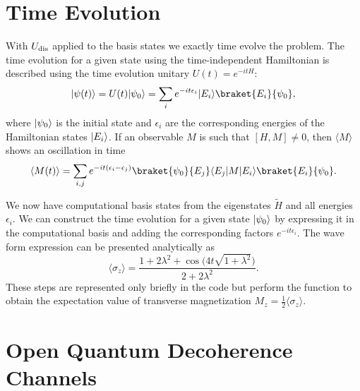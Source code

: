 \documentclass[12pt, twocolumn]{article}
\newcommand*{\eu}{e}
\newcommand*{\iu}{i}
\DeclarePairedDelimiter{\bra}{\langle}{\rvert}
\DeclarePairedDelimiter{\ket}{\lvert}{\rangle}
\begin{document}
  \section{Time Evolution}
  With \( U_{\textnormal{dis}} \) applied to the basis states we exactly time evolve the problem. The time evolution for a given state using the time-independent Hamiltonian is described using the time evolution unitary \( U(t) = \eu^{-\iu t H} \):
  \begin{equation}
    \ket{\psi(t)}
      = U(t) \ket{\psi_{0}}
      = \sum_{i} \eu^{-\iu t \epsilon_{i}} \ket{E_{i}} \braket{E_{i}}{\psi_{0}},
  \end{equation}
  where \( \ket{\psi_{0}} \) is the initial state and \( \epsilon_{i} \) are the corresponding energies of the Hamiltonian states \( \ket{E_{i}} \). If an observable \( M \) is such that \( [H, M] \neq 0 \), then \( \langle M \rangle \) shows an oscillation in time
  \begin{equation}
    \langle M(t) \rangle
      = \sum_{i, j} \eu^{-\iu t (\epsilon_{i} - \epsilon_{j})}
        \braket{\psi_{0}}{E_{j}} \bra{E_{j}} M \ket{E_{i}}
        \braket{E_{i}}{\psi_{0}}.
  \end{equation}

  We now have computational basis states from the eigenstates \( \tilde{H} \) and all energies \( \epsilon_{i} \). We can construct the time evolution for a given state \( \ket{\psi_{0}} \) by expressing it in the computational basis and adding the corresponding factors \( \eu^{-\iu t \epsilon_{i}} \). The wave form expression can be presented analytically as
  \begin{equation}
    \langle \sigma_{z} \rangle
      = \frac{1 + 2 \lambda^{2} + \cos \bigl( 4 t \sqrt{1 + \lambda^{2}} \bigr)}
             {2 + 2 \lambda^{2}}.
  \end{equation}
  These steps are represented only briefly in the code but perform the function to obtain the expectation value of transverse magnetization \( M_{z} = \frac{1}{2} \langle \sigma_{z} \rangle \).

  \section{Open Quantum Decoherence Channels}
\end{document}
